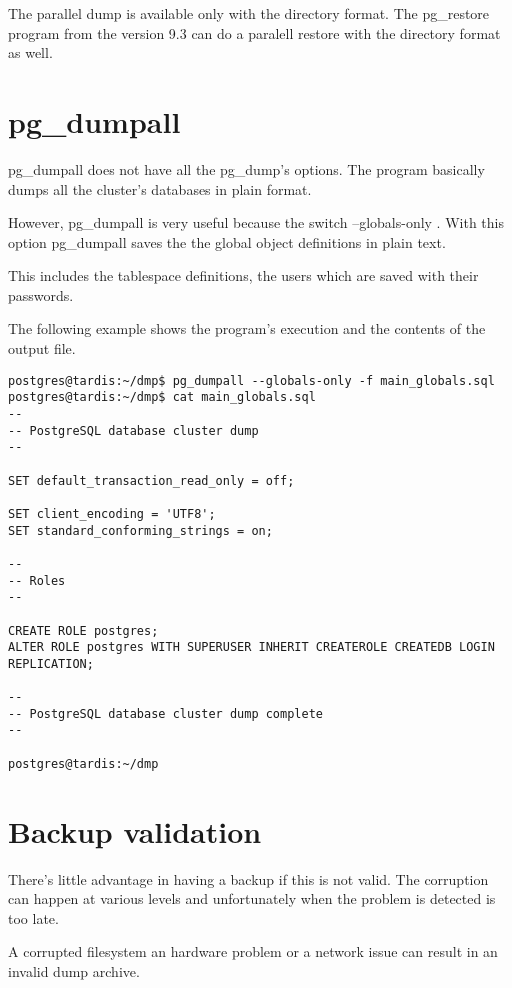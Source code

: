 The parallel dump is available only with the directory format. The pg\_restore program
from the version 9.3 can do a paralell restore with the directory format as well.

\section{pg\_dumpall}
pg\_dumpall does not have all the pg\_dump's options. The program basically dumps all the
cluster's databases in plain format.\newline

However, pg\_dumpall  is very useful because the switch --globals-only .
With this option pg\_dumpall saves the the global object definitions in plain text.\newline

This includes the tablespace definitions, the users which are saved with their passwords.

The following example shows the program's execution and the contents of the output file.
\begin{lstlisting}[style=pgsql]
postgres@tardis:~/dmp$ pg_dumpall --globals-only -f main_globals.sql
postgres@tardis:~/dmp$ cat main_globals.sql
--
-- PostgreSQL database cluster dump
--

SET default_transaction_read_only = off;

SET client_encoding = 'UTF8';
SET standard_conforming_strings = on;

--
-- Roles
--

CREATE ROLE postgres;
ALTER ROLE postgres WITH SUPERUSER INHERIT CREATEROLE CREATEDB LOGIN REPLICATION;

--
-- PostgreSQL database cluster dump complete
--

postgres@tardis:~/dmp

\end{lstlisting}


\section{Backup validation}
There's little advantage in having a backup if this is not valid. The corruption can happen at
various levels and unfortunately when the problem is detected is too late.\newline

A corrupted filesystem an hardware problem or a network issue can result in an invalid dump archive.

